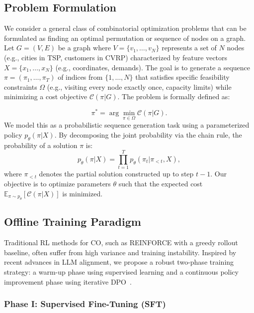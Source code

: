 \documentclass{article}
\theoremstyle{plain}
\theoremstyle{definition}
\theoremstyle{remark}
\begin{document}
\subsection{Problem Formulation}
We consider a general class of combinatorial optimization problems that can be formulated as finding an optimal permutation or sequence of nodes on a graph. Let $G = (V, E)$ be a graph where $V = \{v_1, \dots, v_N\}$ represents a set of $N$ nodes (e.g., cities in TSP, customers in CVRP) characterized by feature vectors $X = \{x_1, \dots, x_N\}$ (e.g., coordinates, demands). The goal is to generate a sequence $\pi = (\pi_1, \dots, \pi_T)$ of indices from $\{1, \dots, N\}$ that satisfies specific feasibility constraints $\Omega$ (e.g., visiting every node exactly once, capacity limits) while minimizing a cost objective $\mathcal{C}(\pi | G)$. The problem is formally defined as:

\begin{equation}
   \pi^* = \arg\min_{\pi \in \Omega} \mathcal{C}(\pi | G).
\end{equation}
We model this as a probabilistic sequence generation task using a parameterized policy $p_\theta(\pi | X)$. By decomposing the joint probability via the chain rule, the probability of a solution $\pi$ is:
\begin{equation}
    p_\theta(\pi | X) = \prod_{t=1}^T p_\theta(\pi_t | \pi_{<t}, X),
\end{equation}
where $\pi_{<t}$ denotes the partial solution constructed up to step $t-1$. Our objective is to optimize parameters $\theta$ such that the expected cost $\mathbb{E}_{\pi \sim p_\theta}[\mathcal{C}(\pi|X)]$ is minimized.
\vspace{-5pt}
\subsection{Offline Training Paradigm}\label{sec:3.3}

Traditional  RL methods for CO, such as REINFORCE with a greedy rollout baseline, often suffer from high variance and training instability. Inspired by recent advances in LLM alignment, we propose a robust two-phase training strategy: a warm-up phase using supervised learning and a continuous policy improvement phase using iterative DPO~\cite{10}.

\subsubsection{Phase I: Supervised Fine-Tuning (SFT)}
\end{document}
